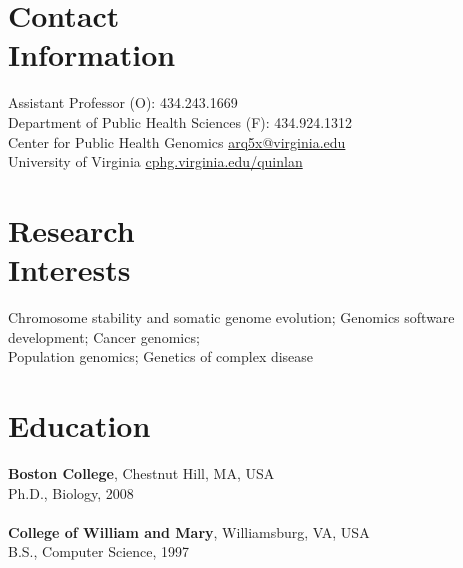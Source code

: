 \documentclass[margin,line]{cv}
\begin{document}
\begin{resume}
    \section{\mysidestyle Contact\\Information}
    Assistant Professor                            \hfill (O): 434.243.1669          \vspace{0mm}\\\vspace{0mm}%
    Department of Public Health Sciences                          \hfill (F): 434.924.1312          \vspace{0mm}\\\vspace{0mm}%
    Center for Public Health Genomics      \hfill \url{arq5x@virginia.edu}  \vspace{0mm}\\\vspace{-4.5mm}%
    University of Virginia      \hfill \url{cphg.virginia.edu/quinlan}  \vspace{0mm}\\\vspace{0mm}%

    \section{\mysidestyle Research\\Interests}

    Chromosome stability and somatic genome evolution; Genomics software development; Cancer genomics; \\ 
    Population genomics; Genetics of complex disease 

    \section{\mysidestyle Education}

    \textbf{Boston College}, Chestnut Hill, MA, USA\\
    Ph.D., Biology, 2008\\
    \\
    \textbf{College of William and Mary}, Williamsburg, VA, USA\\
    B.S., Computer Science, 1997



\end{resume}
\end{document}
